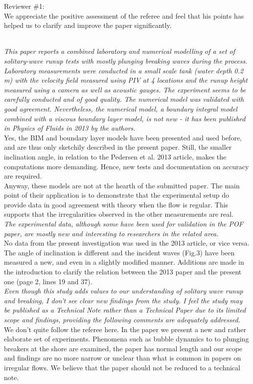 \documentclass[11pt]{article}
\begin{document}
\newcommand{\refpoint}[1]{\ \vspace{0.3cm}\\ {\em #1}\  \vspace{0.3cm}\\ }
\newcommand{\todo}[1]{\ \\ {\bf To do: #1}}
Reviewer \#1: 
\\

We appreciate the positive assessment of the referee and feel that his points has helped us to clarify and improve the paper significantly.

\refpoint{This paper reports a combined laboratory and numerical modelling of a set of solitary-wave runup tests 
with mostly plunging breaking waves during the process.  Laboratory measurements were conducted in a small scale tank 
(water depth 0.2 m) with the velocity field measured using PIV at 4 locations and the runup height measured using a 
camera as well as acoustic gauges.  The experiment seems to be carefully conducted and of good quality.  The numerical
 model was validated with good agreement.  Nevertheless, the numerical model, a boundary integral model combined with a
 viscous boundary layer model, is not new - it has been published in Physics of Fluids in 2013 by the authors.}
Yes, the BIM and boundary layer models have been presented and used before, and are thus only sketchily described 
in the present paper. Still, the smaller inclination angle, in relation to the Pedersen et al. 2013 article, makes the 
computations more demanding. Hence, new tests and documentation on accuracy are required.\\
Anyway, these models are not at the hearth of the submitted paper.
The main point of their application  is to demonstrate that the experimental setup do
provide data in good agreement with theory when the flow is regular. This supports that the irregularities
observed in the other measurements are real.   
 \refpoint{The 
experimental data, although some have been used for validation in the POF paper, are mostly new and interesting to 
researchers in the related area.}
No data from the present investigation was used in the 2013 article, or vice versa. The angle of inclination
is different and the incident waves (Fig.3) have been measured a new, and even in a slightly modified manner. 
Additions are made in the introduction to clarify the relation between the 2013 paper and the present one (page 2, lines 19 and 37).
\refpoint{ Even though this study adds values to our understanding of solitary wave runup and 
breaking, I don't see clear new findings from the study.
 I feel the study may be published as a Technical Note rather than a Technical Paper due to its limited scope and 
findings, providing the following comments are adequately addressed.}
We don't quite follow the referee here. In the paper we present a new and rather elaborate set of experiments.
Phenomena such as bubble dynamics to to plunging breakers at the shore are examined, 
the paper has normal length and our scope and findings are no more narrow or unclear than what is common in 
papers on irregular flows.
We believe that the paper should not be reduced to a technical note. 
\end{document}
